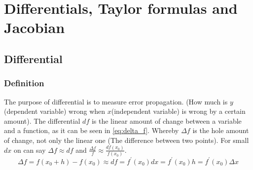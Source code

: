 \section{Differentials, Taylor formulas and Jacobian}
\subsection{Differential}
\subsubsection{Definition}\label{subsubsec:differential}
The purpose of differential is to measure error propagation. (How much is $y$(dependent variable) wrong when $x$(independent variable) is wrong by a certain amount).
The differential $df$ is the linear amount of change between a variable and a function, as it can be seen in \autoref{eq:delta_f}. Whereby $\Delta f$ is the hole amount of change, not only the linear one (The difference between two points). For small $dx$ on can say $\Delta f \approx df$ and $\frac{\Delta f}{f} \approx \frac{d f\left(x_{0}\right)}{f\left(x_{0}\right)}$.
\begin{equation}\label{eq:delta_f}
\Delta f=f\left(x_{0}+h\right)-f\left(x_{0}\right) \approx d f=f^{\prime}\left(x_{0}\right) d x=f^{\prime}\left(x_{0}\right) h=f^{\prime}\left(x_{0}\right) \Delta x
\end{equation}

